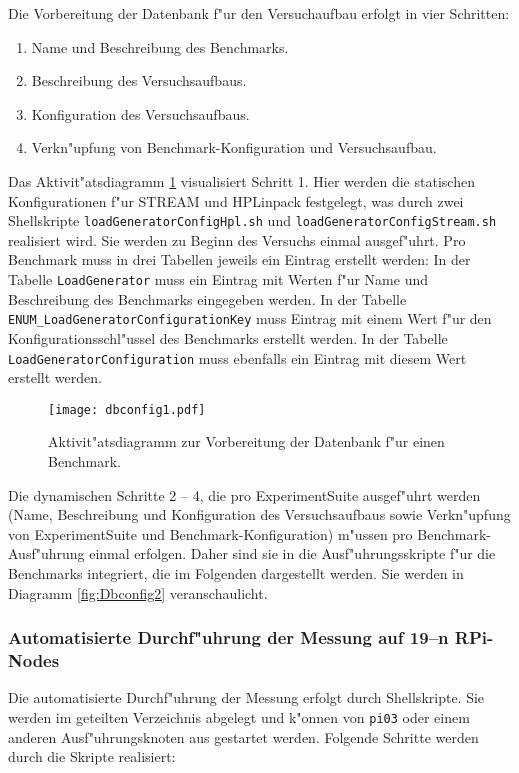 Die Vorbereitung der Datenbank f"ur den Versuchaufbau erfolgt in vier Schritten:  
\begin{enumerate}\bfseries
	\item Name und Beschreibung des Benchmarks. 
	\item Beschreibung des Versuchsaufbaus. 
	\item Konfiguration des Versuchsaufbaus. 
	\item Verkn"upfung von Benchmark-Konfiguration und Versuchsaufbau.
\end{enumerate} 
Das Aktivit"atsdiagramm \ref{fig:Dbconfig1} visualisiert Schritt 1. Hier werden die statischen Konfigurationen f"ur STREAM und HPLinpack festgelegt, was durch zwei Shellskripte \texttt{loadGeneratorCon\-figHpl.sh} und \texttt{loadGenerator\-ConfigStream.sh} realisiert wird. Sie werden zu Beginn des Versuchs einmal ausgef"uhrt. Pro Benchmark muss in drei Tabellen jeweils ein Eintrag erstellt werden: In der Tabelle \texttt{LoadGenerator} muss ein Eintrag mit Werten f"ur Name und Beschreibung des Benchmarks eingegeben werden. In der Tabelle \texttt{ENUM\_LoadGeneratorConfigura\-tionKey} muss Eintrag mit einem Wert f"ur den Konfigurationsschl"ussel des Benchmarks erstellt werden. In der Tabelle \texttt{LoadGeneratorConfiguration} muss ebenfalls ein Eintrag mit diesem Wert erstellt werden.
\begin{figure}[htb]
\centering
\texttt{[image: dbconfig1.pdf]}
\caption{Aktivit"atsdiagramm zur Vorbereitung der Datenbank f"ur einen Benchmark.}
\label{fig:Dbconfig1}
\end{figure}
Die dynamischen Schritte 2 -- 4, die pro ExperimentSuite ausgef"uhrt werden (Name, Beschreibung und Konfiguration des Versuchsaufbaus sowie Verkn"upfung von ExperimentSuite und Benchmark-Konfiguration) m"ussen pro Benchmark-Ausf"uhrung einmal erfolgen. Daher sind sie in die Ausf"uhrungsskripte f"ur die Benchmarks integriert, die im Folgenden dargestellt werden. Sie werden in Diagramm \ref{fig:Dbconfig2} veranschaulicht. 

\subsubsection{Automatisierte Durchf"uhrung der Messung auf 19--n RPi-Nodes} 

Die automatisierte Durchf"uhrung der Messung erfolgt durch Shellskripte. Sie werden im geteilten Verzeichnis abgelegt und k"onnen von \texttt{pi03} oder einem anderen Ausf"uhrungsknoten aus gestartet werden. Folgende Schritte werden durch die Skripte realisiert: 

